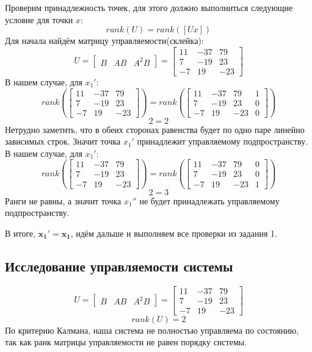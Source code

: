 Проверим принадлежность точек, для этого должно выполниться следующие условие для точки $x$:
$$
    rank(U) = rank([U x])
$$
Для начала найдём матрицу управляемости(склейка):
$$
    U = \begin{bmatrix}
        B & AB & A^2B
    \end{bmatrix} = \begin{bmatrix}
                    11   &	-37	&  79 \\
                    7   &   -19  &  23 \\
                    -7  &    19  &  -23
                \end{bmatrix}
$$
В нашем случае, для $x_1'$:
$$
rank(\begin{bmatrix}
    11   &	-37	&  79 \\
    7   &   -19  &  23 \\
    -7  &    19  &  -23
\end{bmatrix}) = rank(\begin{bmatrix}
    11   &	-37	&  79   & 1\\
    7   &   -19  &  23  & 0\\
    -7  &    19  &  -23 & 0
\end{bmatrix})
$$
$$2 = 2$$
Нетрудно заметить, что в обеих сторонах равенства будет по одно паре линейно зависимых строк. 
Значит точка $x_1'$ принадлежит управляемому подпространству.
В нашем случае, для $x_1'$:
$$
rank(\begin{bmatrix}
    11   &	-37	&  79 \\
    7   &   -19  &  23 \\
    -7  &    19  &  -23
\end{bmatrix}) = rank(\begin{bmatrix}
    11   &	-37	&  79   & 0\\
    7   &   -19  &  23  & 0\\
    -7  &    19  &  -23 & 1
\end{bmatrix})
$$
$$2 = 3$$
Ранги не равны, а значит точка $x_1''$ не будет принадлежать управляемому подпространству.

В итоге, $\mathbf{x_1' = x_1}$, идём дальше и выполняем все проверки из задания 1.

\subsection{Исследование управляемости системы}

$$
U = \begin{bmatrix}
    B & AB & A^2B
\end{bmatrix} = \begin{bmatrix}
                11   &	-37	&  79 \\
                7   &   -19  &  23 \\
                -7  &    19  &  -23
            \end{bmatrix}
$$
$$
  rank(U) = 2
$$
По критерию Калмана, наша система не полностью управляема по состоянию, так как ранк матрицы управляемости не равен порядку системы.

